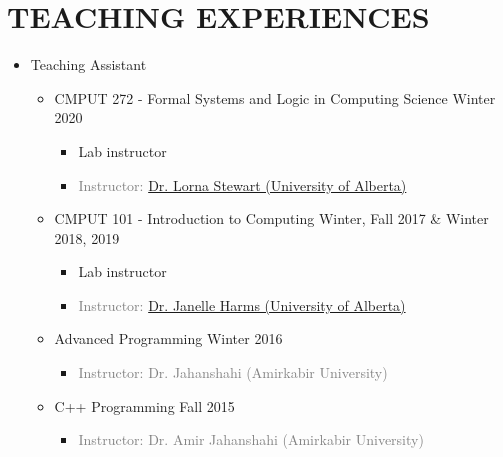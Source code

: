 \documentclass[10pt,a4paper,sans]{moderncv} %
\begin{document}
	\section{TEACHING EXPERIENCES}
	\begin{itemize}
		\item Teaching Assistant
		\begin{itemize}
			
			\item {} CMPUT 272 - Formal Systems and Logic in Computing Science \hfill Winter 2020
			\begin{itemize} 
				\item Lab instructor
				
				\item\textcolor{gray}{Instructor: \href{http://webdocs.cs.ualberta.ca/~stewart/}{Dr. Lorna Stewart  (University of Alberta)}}
			\end{itemize}
			
			\item {} CMPUT 101 - Introduction to Computing \hfill Winter, Fall 2017 \& Winter 2018, 2019
			\begin{itemize} 
				\item Lab instructor
				
				\item\textcolor{gray}{Instructor: \href{https://webdocs.cs.ualberta.ca/~harms/}{Dr. Janelle Harms (University of Alberta)}}
			\end{itemize}
			
			\item {} Advanced Programming \hfill Winter 2016
			\begin{itemize} 
				\item\textcolor{gray}{Instructor: Dr. Jahanshahi (Amirkabir University)}
			\end{itemize}
			
			\item {} C++ Programming \hfill Fall 2015
			\begin{itemize} 
				\item \textcolor{gray}{Instructor: Dr. Amir Jahanshahi (Amirkabir University)}
			\end{itemize}
			

\end{itemize}
\end{itemize}
\end{document}
